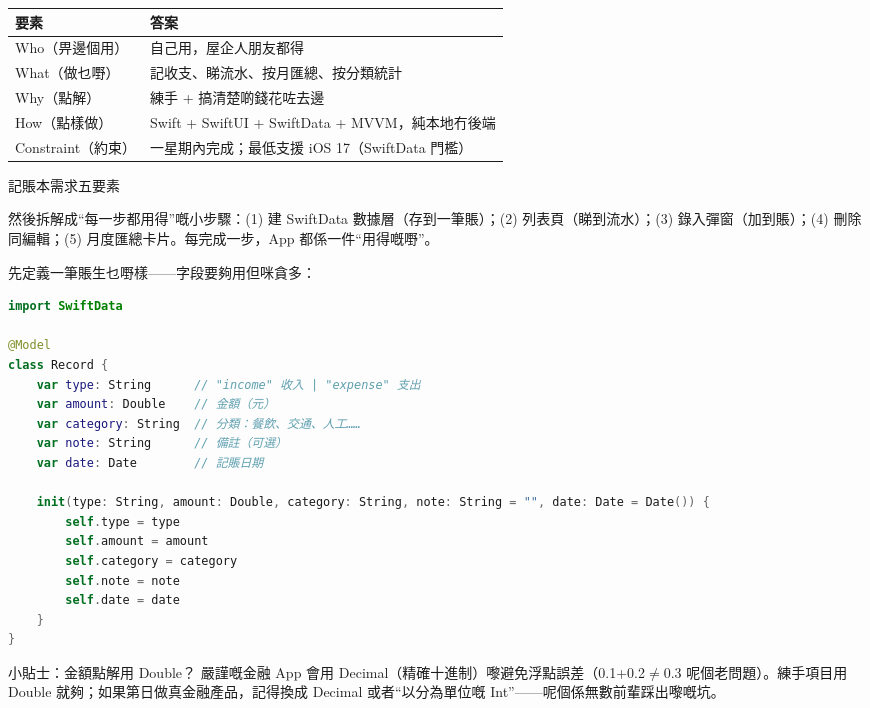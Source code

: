 


\begin{center}
\begin{tabularx}{\linewidth}{|X|X|}
\hline
\textbf{要素} & \textbf{答案} \tabularnewline
\hline
Who（畀邊個用） & 自己用，屋企人朋友都得 \tabularnewline
What（做乜嘢） & 記收支、睇流水、按月匯總、按分類統計 \tabularnewline
Why（點解） & 練手 + 搞清楚啲錢花咗去邊 \tabularnewline
How（點樣做） & Swift + SwiftUI + SwiftData + MVVM，純本地冇後端 \tabularnewline
Constraint（約束） & 一星期內完成；最低支援 iOS 17（SwiftData 門檻） \tabularnewline
\hline
\end{tabularx}
\end{center}

\begin{center}\small\color{gray}記賬本需求五要素\end{center}

然後拆解成“每一步都用得”嘅小步驟：(1) 建 SwiftData 數據層（存到一筆賬）；(2) 列表頁（睇到流水）；(3) 錄入彈窗（加到賬）；(4) 刪除同編輯；(5) 月度匯總卡片。每完成一步，App 都係一件“用得嘅嘢”。


先定義一筆賬生乜嘢樣——字段要夠用但咪貪多：

\begin{lstlisting}[language=Swift]
import SwiftData

@Model
class Record {
    var type: String      // "income" 收入 | "expense" 支出
    var amount: Double    // 金額（元）
    var category: String  // 分類：餐飲、交通、人工……
    var note: String      // 備註（可選）
    var date: Date        // 記賬日期

    init(type: String, amount: Double, category: String, note: String = "", date: Date = Date()) {
        self.type = type
        self.amount = amount
        self.category = category
        self.note = note
        self.date = date
    }
}
\end{lstlisting}

\begin{tcbinfo}{小貼士：金額點解用 Double？}
嚴謹嘅金融 App 會用 Decimal（精確十進制）嚟避免浮點誤差（0.1+0.2$\neq$0.3 呢個老問題）。練手項目用 Double 就夠；如果第日做真金融產品，記得換成 Decimal 或者“以分為單位嘅 Int”——呢個係無數前輩踩出嚟嘅坑。

\end{tcbinfo}

